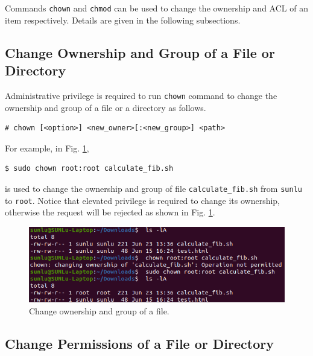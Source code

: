 Commands \verb|chown| and \verb|chmod| can be used to change the ownership and ACL of an item respectively. Details are given in the following subsections.

\subsection{Change Ownership and Group of a File or Directory}

Administrative privilege is required to run \verb|chown| command to change the ownership and group of a file or a directory as follows.
\begin{lstlisting}
# chown [<option>] <new_owner>[:<new_group>] <path>
\end{lstlisting}
For example, in Fig. \ref{ch:fm:fig:chownexp},
\begin{lstlisting}
$ sudo chown root:root calculate_fib.sh
\end{lstlisting}
is used to change the ownership and group of file \verb|calculate_fib.sh| from \verb|sunlu| to \verb|root|. Notice that elevated privilege is required to change its ownership, otherwise the request will be rejected as shown in Fig. \ref{ch:fm:fig:chownexp}.

\begin{figure}[htbp]
	\centering
	\includegraphics[width=350pt]{chapters/part-1/figures/chownexp.png}
	\caption{Change ownership and group of a file.} \label{ch:fm:fig:chownexp}
\end{figure}

\subsection{Change Permissions of a File or Directory}

